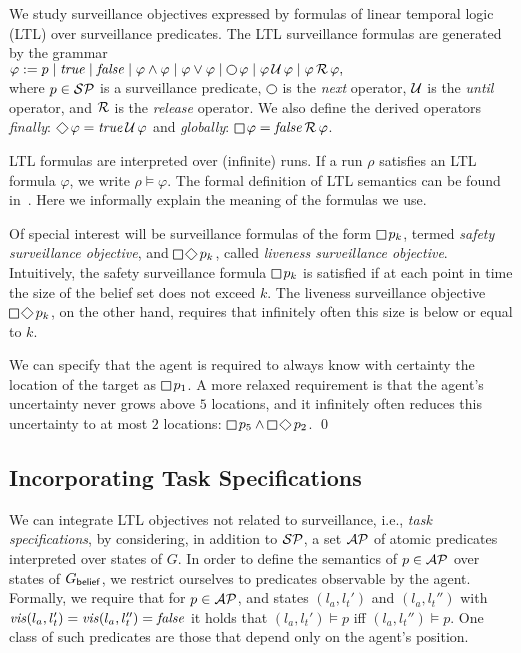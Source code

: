 We study surveillance objectives expressed by formulas of linear temporal logic (LTL) over surveillance predicates.
 The LTL surveillance formulas  are generated by the grammar\\
$\varphi := p \mid \true \mid \false \mid \varphi \wedge \varphi \mid \varphi \vee \varphi \mid \LTLnext  \varphi  \mid \varphi \LTLuntil \varphi \mid \varphi \LTLrelease \varphi,$\\
where $p \in \mathcal{SP}$ is a surveillance predicate, $\LTLnext$ is the \emph{next} operator, $\operatorname{\mathcal{U}}$ is the \emph{until} operator, and $\operatorname{\mathcal{R}}$ is the \emph{release} operator. We also define the derived operators 
\emph{finally}: $\LTLfinally \varphi = \true \LTLuntil \varphi$ and 
\emph{globally}: $\LTLglobally \varphi = \false \LTLrelease \varphi$.

LTL formulas are interpreted over (infinite) runs. If a run $\rho$ satisfies an LTL formula $\varphi$, we write $\rho \models \varphi$. The formal definition of LTL semantics can be found in~\cite{BaierKatoen08}. Here we informally explain the meaning of the formulas we use.

Of special interest will be surveillance formulas of the form $\LTLglobally p_k$, termed \emph{safety surveillance objective}, and $\LTLglobally\LTLfinally p_k$, called \emph{liveness surveillance objective}.
Intuitively, the safety surveillance formula $\LTLglobally p_k$ is satisfied if at each point in time the size of the belief set does not exceed $k$. The liveness surveillance objective $\LTLglobally\LTLfinally p_k$, on the other hand, requires that infinitely often this size is below or equal to $k$.

\begin{example}
We can specify that the agent is required to always know with certainty the location of the target as
$\LTLglobally p_1$.
A more relaxed requirement is that the agent's uncertainty never grows above $5$ locations, and it infinitely often reduces this uncertainty to at most $2$ locations: $\LTLglobally p_5 \wedge \LTLglobally\LTLfinally p_2$.
\qed
\end{example}


\subsection{Incorporating Task Specifications}
We can integrate LTL objectives not related to surveillance, i.e., \emph{task specifications}, by considering, in addition to $\mathcal{SP}$, a set $\mathcal{AP}$ of atomic predicates interpreted over states of $G$. In order to define the semantics of $p \in \mathcal{AP}$ over states of $G_{\mathsf{belief}}$, we restrict ourselves to predicates observable by the agent. 
Formally, we require that for $p \in \mathcal{AP}$, and states $(l_a,l_t')$ and $(l_a,l_t'')$ with $\mathit{vis}(l_a,l_t')=\mathit{vis}(l_a,l_t'')=\mathit{false}$ it holds that $(l_a,l_t') \models p$ iff $(l_a,l_t'') \models p$. One class of such predicates are those that depend only on the agent's position.

